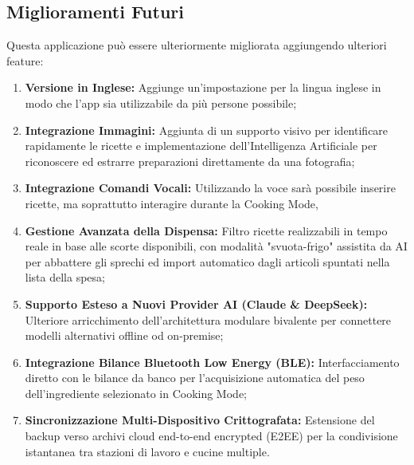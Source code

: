 \documentclass[11pt,a4paper,titlepage]{article}
\begin{document}
\subsection{Miglioramenti Futuri}
Questa applicazione pu\`o essere ulteriormente migliorata aggiungendo ulteriori feature:
\begin{enumerate}
	\item \textbf{Versione in Inglese:} Aggiunge un'impostazione per la lingua inglese in modo che l'app sia utilizzabile da più persone possibile; 
	\item \textbf{Integrazione Immagini:} Aggiunta di un supporto visivo per identificare rapidamente le ricette e implementazione dell'Intelligenza Artificiale per riconoscere ed estrarre preparazioni direttamente da una fotografia;
	\item \textbf{Integrazione Comandi Vocali:} Utilizzando la voce sarà possibile inserire ricette, ma soprattutto interagire durante la Cooking Mode,
	\item \textbf{Gestione Avanzata della Dispensa:} Filtro ricette realizzabili in tempo reale in base alle scorte disponibili, con modalit\`a "svuota-frigo" assistita da AI per abbattere gli sprechi ed import automatico dagli articoli spuntati nella lista della spesa;
	\item \textbf{Supporto Esteso a Nuovi Provider AI (Claude \& DeepSeek):} Ulteriore arricchimento dell'architettura modulare bivalente per connettere modelli alternativi offline od on-premise;
	\item \textbf{Integrazione Bilance Bluetooth Low Energy (BLE):} Interfacciamento diretto con le bilance da banco per l'acquisizione automatica del peso dell'ingrediente selezionato in Cooking Mode;
	\item \textbf{Sincronizzazione Multi-Dispositivo Crittografata:} Estensione del backup verso archivi cloud end-to-end encrypted (E2EE) per la condivisione istantanea tra stazioni di lavoro e cucine multiple.
\end{enumerate}
\end{document}

